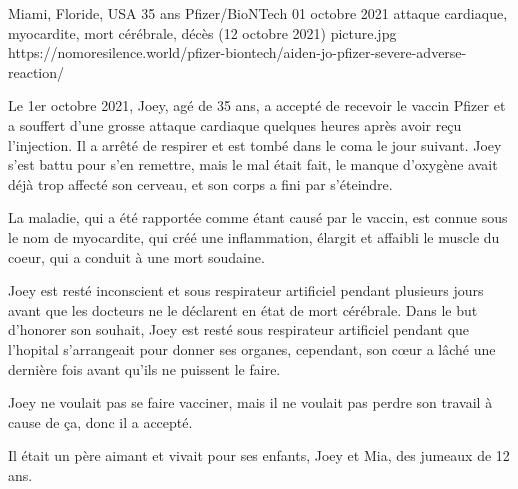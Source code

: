           {Miami, Floride, USA}
          {35 ans}
          {Pfizer/BioNTech}
          {01 octobre 2021}
          {attaque cardiaque, myocardite, mort cérébrale, décès (12 octobre 2021)}
          {picture.jpg}
          {https://nomoresilence.world/pfizer-biontech/aiden-jo-pfizer-severe-adverse-reaction/}
          {

Le 1er octobre 2021, Joey, agé de 35 ans, a accepté de recevoir le vaccin Pfizer
et a souffert d'une grosse attaque cardiaque quelques heures après avoir reçu
l'injection. Il a arrêté de respirer et est tombé dans le coma le jour
suivant. Joey s'est battu pour s'en remettre, mais le mal était fait, le manque
d'oxygène avait déjà trop affecté son cerveau, et son corps a fini par
s'éteindre.

La maladie, qui a été rapportée comme étant causé par le vaccin, est connue sous
le nom de myocardite, qui créé une inflammation, élargit et affaibli le muscle
du coeur, qui a conduit à une mort soudaine.

Joey est resté inconscient et sous respirateur artificiel pendant plusieurs
jours avant que les docteurs ne le déclarent en état de mort cérébrale. Dans le
but d'honorer son souhait, Joey est resté sous respirateur artificiel pendant
que l'hopital s'arrangeait pour donner ses organes, cependant, son cœur a lâché
une dernière fois avant qu'ils ne puissent le faire.

Joey ne voulait pas se faire vacciner, mais il ne voulait pas perdre son travail
à cause de ça, donc il a accepté.

Il était un père aimant et vivait pour ses enfants, Joey et Mia, des jumeaux de
12 ans.
  
}
